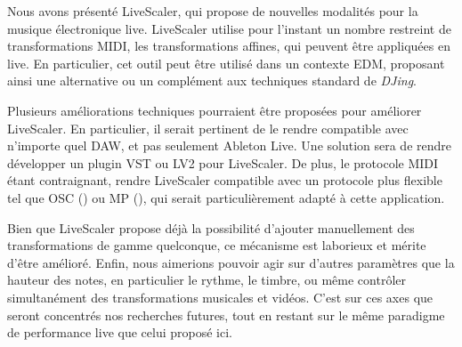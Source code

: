 Nous avons présenté LiveScaler, qui propose de nouvelles modalités pour la musique électronique live. LiveScaler utilise pour l'instant un nombre restreint de transformations MIDI, les transformations affines, qui peuvent être appliquées en live. En particulier, cet outil peut être utilisé dans un contexte EDM, proposant ainsi une alternative ou un complément aux techniques standard de \emph{DJing}.

Plusieurs améliorations techniques pourraient être proposées pour améliorer LiveScaler. En particulier, il serait pertinent de le rendre compatible avec n'importe quel DAW, et pas seulement Ableton Live. Une solution sera de rendre développer un plugin VST ou LV2 pour LiveScaler. De plus, le protocole MIDI étant contraignant, rendre LiveScaler compatible avec un protocole plus flexible tel que OSC (\cite{wright2005open}) ou MP (\cite{goudard2017mapping}), qui serait particulièrement adapté à cette application.

Bien que LiveScaler propose déjà la possibilité d'ajouter manuellement des transformations de gamme quelconque, ce mécanisme est laborieux et mérite d'être amélioré. Enfin, nous aimerions pouvoir agir sur d'autres paramètres que la hauteur des notes, en particulier le rythme, le timbre, ou même contrôler simultanément des transformations musicales et vidéos. C'est sur ces axes que seront concentrés nos recherches futures, tout en restant sur le même paradigme de performance live que celui proposé ici.
